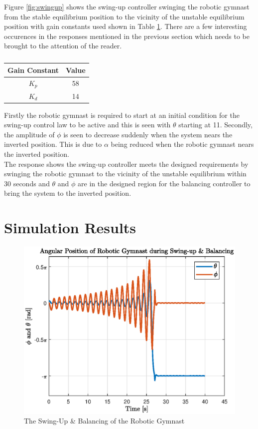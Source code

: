 Figure \ref{fig:swingup} shows the swing-up controller swinging the robotic gymnast from the stable equilibrium position to the vicinity of the unstable equilibrium position with gain constants used shown in Table \ref{table:gain_constants}. There are a few interesting occurences in the responses mentioned in the previous section which needs to be brought to the attention of the reader.\\

\begin{table}[]
	\centering
	\begin{tabular}{|c|c|}
		\hline
		Gain Constant & Value \\
		\hline
		\hline
		$K_{p}$  & 58 \\
		\hline
		$K_{d}$  & 14 \\
		\hline
	\end{tabular}
	\caption{}
	\label{table:gain_constants}
	\end{table}

Firstly the robotic gymnast is required to start at an initial condition for the swing-up control law to be active and this is seen with $\theta$ starting at 11\textdegree. Secondly, the amplitude of $\phi$ is seen to decrease suddenly when the system nears the inverted position. This is due to $\alpha$ being reduced when the robotic gymnast nears the inverted position.\\

The response shows the swing-up controller meets the designed requirements by swinging the robotic gymnast to the vicinity of the unstable equilibrium within 30 seconds and $\theta$ and $\phi$ are in the designed region for the balancing controller to bring the system to the inverted position.



\section{Simulation Results}
\begin{figure}[h]
	\centering
	\includegraphics[scale=1]{./figs/swingup_balance}
	\caption{The Swing-Up \& Balancing of the Robotic Gymnast}
	\label{fig:swingup_balance}
\end{figure}


